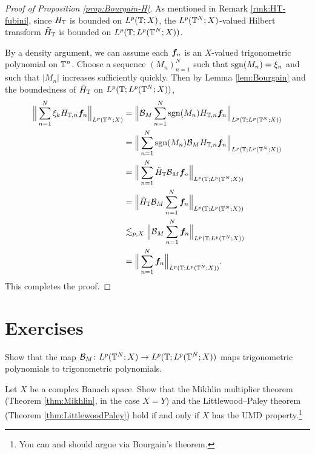 \begin{proof}[Proof of Proposition \ref{prop:Bourgain-H}]
  As mentioned in Remark \ref{rmk:HT-fubini}, since $H_{\mathbb{T}}$ is bounded on $L^p(\mathbb{T};X)$,  the $L^p(\mathbb{T}^{N};X)$-valued Hilbert transform $\tilde{H}_{\mathbb{T}}$ is bounded on $L^p(\mathbb{T};L^p(\mathbb{T}^{N};X))$. 
  
  By a density argument, we can assume each $\bm{f}_{n}$ is an $X$-valued trigonometric polynomial on $\mathbb{T}^{n}$.
  Choose a sequence $(M_{n})_{n=1}^{N}$ such that $\operatorname{sgn}(M_n) = \xi_{n}$ and such that $|M_n|$ increases sufficiently quickly.
  Then by Lemma \ref{lem:Bourgain} and the boundedness of $\tilde{H}_{\mathbb{T}}$ on $L^p(\mathbb{T};L^p(\mathbb{T}^{N};X))$,
  \begin{equation*}
    \begin{aligned}
      \Big\| \sum_{n=1}^{N} \xi_{k} H_{\mathbb{T},n} \bm{f}_{n} \Big\|_{L^p(\mathbb{T}^{N};X)}
      &= \Big\| \mathcal{B}_{M} \sum_{n=1}^{N} \operatorname{sgn}(M_n) H_{\mathbb{T},n} \bm{f}_{n} \Big\|_{L^p(\mathbb{T};L^p(\mathbb{T}^{N};X))} \\
      &= \Big\| \sum_{n=1}^{N} \operatorname{sgn}(M_n) \mathcal{B}_{M} H_{\mathbb{T},n} \bm{f}_{n} \Big\|_{L^p(\mathbb{T};L^p(\mathbb{T}^{N};X))} \\
      &= \Big\| \sum_{n=1}^{N} \tilde{H}_{\mathbb{T}} \mathcal{B}_{M} \bm{f}_{n} \Big\|_{L^p(\mathbb{T};L^p(\mathbb{T}^{N};X))} \\
      &=  \Big\| \tilde{H}_{\mathbb{T}} \mathcal{B}_{M}\sum_{n=1}^{N} \bm{f}_{n} \Big\|_{L^p(\mathbb{T};L^p(\mathbb{T}^{N};X))} \\
      &\lesssim_{p,X} \Big\| \mathcal{B}_{M} \sum_{n=1}^{N} \bm{f}_{n} \Big\|_{L^p(\mathbb{T};L^p(\mathbb{T}^{N};X))} \\
      &= \Big\| \sum_{n=1}^{N} \bm{f}_{n} \Big\|_{L^p(\mathbb{T};L^p(\mathbb{T}^{N};X))}.
    \end{aligned}
  \end{equation*}
  This completes the proof.
\end{proof}






\section*{Exercises}

\begin{exercise}\label{ex:B-trigpoly}
  Show that the map $\mathcal{B}_{M} \colon L^p(\mathbb{T}^{N};X) \to L^p(\mathbb{T};L^p(\mathbb{T}^{N};X))$ maps trigonometric polynomials to trigonometric polynomials.
\end{exercise}

\begin{exercise}
  Let $X$ be a complex Banach space.
  Show that the Mikhlin multiplier theorem (Theorem \ref{thm:Mikhlin}, in the case $X = Y$) and the Littlewood--Paley theorem (Theorem \ref{thm:LittlewoodPaley}) hold if and only if $X$ has the UMD property.\footnote{You can and should argue via Bourgain's theorem.}
\end{exercise}




